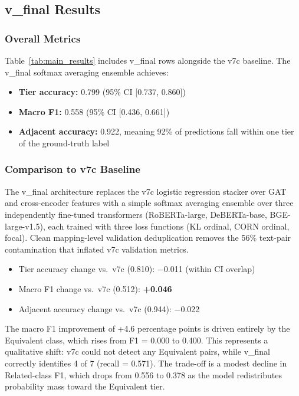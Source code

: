 \subsection{v\_final Results}

\subsubsection{Overall Metrics}

Table~\ref{tab:main_results} includes v\_final rows alongside the v7c
baseline. The v\_final softmax averaging ensemble achieves:

\begin{itemize}
    \item \textbf{Tier accuracy:} 0.799 (95\% CI [0.737, 0.860])
    \item \textbf{Macro F1:} 0.558 (95\% CI [0.436, 0.661])
    \item \textbf{Adjacent accuracy:} 0.922, meaning 92\% of predictions
          fall within one tier of the ground-truth label
\end{itemize}

\subsubsection{Comparison to v7c Baseline}

The v\_final architecture replaces the v7c logistic regression stacker
over GAT and cross-encoder features with a simple softmax averaging
ensemble over three independently fine-tuned transformers (RoBERTa-large,
DeBERTa-base, BGE-large-v1.5), each trained with three loss functions
(KL ordinal, CORN ordinal, focal). Clean mapping-level validation
deduplication removes the 56\% text-pair contamination that inflated
v7c validation metrics.

\begin{itemize}
    \item Tier accuracy change vs.\ v7c (0.810): $-$0.011 (within CI overlap)
    \item Macro F1 change vs.\ v7c (0.512): \textbf{+0.046}
    \item Adjacent accuracy change vs.\ v7c (0.944): $-$0.022
\end{itemize}

The macro F1 improvement of +4.6 percentage points is driven entirely
by the Equivalent class, which rises from F1 = 0.000 to 0.400. This
represents a qualitative shift: v7c could not detect any Equivalent
pairs, while v\_final correctly identifies 4 of 7 (recall = 0.571).
The trade-off is a modest decline in Related-class F1, which drops
from 0.556 to 0.378 as the model redistributes probability mass
toward the Equivalent tier.

